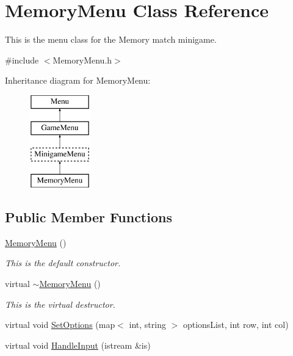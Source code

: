 \hypertarget{classMemoryMenu}{\section{Memory\-Menu Class Reference}
\label{classMemoryMenu}
}


This is the menu class for the Memory match minigame.  




{\ttfamily \#include $<$Memory\-Menu.\-h$>$}

Inheritance diagram for Memory\-Menu\-:\begin{figure}[H]
\begin{center}
\leavevmode
\includegraphics[height=4.000000cm]{classMemoryMenu}
\end{center}
\end{figure}
\subsection*{Public Member Functions}
\begin{DoxyCompactItemize}
\item 
\hypertarget{classMemoryMenu_ae86d93eea6621532fba704fed5c9ec33}{\hyperlink{classMemoryMenu_ae86d93eea6621532fba704fed5c9ec33}{Memory\-Menu} ()}\label{classMemoryMenu_ae86d93eea6621532fba704fed5c9ec33}

\begin{DoxyCompactList}\small\item\em This is the default constructor. \end{DoxyCompactList}\item 
\hypertarget{classMemoryMenu_a4f364ab881bd477e664ef77ceea105fe}{virtual \hyperlink{classMemoryMenu_a4f364ab881bd477e664ef77ceea105fe}{$\sim$\-Memory\-Menu} ()}\label{classMemoryMenu_a4f364ab881bd477e664ef77ceea105fe}

\begin{DoxyCompactList}\small\item\em This is the virtual destructor. \end{DoxyCompactList}\item 
virtual void \hyperlink{classMemoryMenu_a71fb82f5208c0f073fc54b6af0917f04}{Set\-Options} (map$<$ int, string $>$ options\-List, int row, int col)
\item 
virtual void \hyperlink{classMemoryMenu_afbe9762ac2e61c6eba82df18aa9aea73}{Handle\-Input} (istream \&is)
\end{DoxyCompactItemize}
